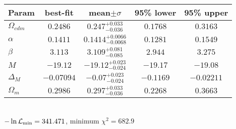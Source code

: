 \begin{tabular}{|l|c|c|c|c|} 
 \hline 
Param & best-fit & mean$\pm\sigma$ & 95\% lower & 95\% upper \\ \hline 
$\Omega_{cdm }$ &$0.2486$ & $0.247_{-0.036}^{+0.033}$ & $0.1768$ & $0.3163$ \\ 
$\alpha$ &$0.1411$ & $0.1414_{-0.0068}^{+0.0066}$ & $0.1281$ & $0.1549$ \\ 
$\beta$ &$3.113$ & $3.109_{-0.085}^{+0.081}$ & $2.944$ & $3.275$ \\ 
$M$ &$-19.12$ & $-19.12_{-0.024}^{+0.023}$ & $-19.17$ & $-19.08$ \\ 
$\Delta_{M }$ &$-0.07094$ & $-0.07_{-0.024}^{+0.023}$ & $-0.1169$ & $-0.02211$ \\ 
$\Omega_{m }$ &$0.2986$ & $0.297_{-0.036}^{+0.033}$ & $0.2268$ & $0.3663$ \\ 
\hline 
 \end{tabular} \\ 
$-\ln{\cal L}_\mathrm{min} =341.471$, minimum $\chi^2=682.9$ \\ 
